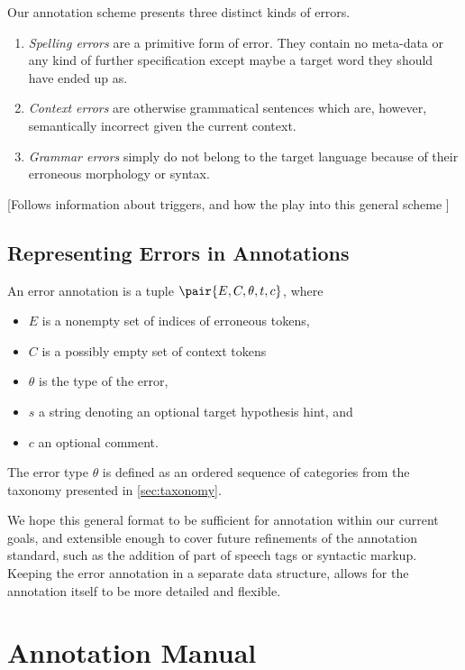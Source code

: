 \documentclass{scrartcl}
\begin{document}
Our annotation scheme presents three distinct kinds of errors.

\begin{enumerate}
\item \textit{Spelling errors} are a primitive form of error. They contain no
meta-data or any kind of further specification except maybe a target word they
should have ended up as.
\item \textit{Context errors} are otherwise grammatical sentences which are,
however, semantically incorrect given the current context.
\item \textit{Grammar errors} simply do not belong to the target language because
of their erroneous morphology or syntax.
\end{enumerate}

[Follows information about triggers, and how the play into this general scheme ]

\subsection{Representing Errors in Annotations}\label{sec:errorformat}

An error annotation is a tuple $\pair{E,C,\theta,t,c}$, where
\begin{itemize}
  \item $E$ is a nonempty set of indices of erroneous tokens,
  \item $C$ is a possibly empty set of context tokens 
  \item $\theta$ is the type of the error,
  \item $s$ a string denoting an optional target hypothesis hint, and
  \item $c$ an optional comment.
\end{itemize}

The error type $\theta$ is defined as an ordered sequence of categories from the
taxonomy presented in \ref{sec:taxonomy}.

We hope this general format to be sufficient for annotation within our current
goals, and extensible enough to cover future refinements of the annotation
standard, such as the addition of part of speech tags or syntactic markup.
Keeping the error annotation in a separate data structure, allows for the
annotation itself to be more detailed and flexible.

\section{Annotation Manual}\label{sec:manual}
\end{document}
